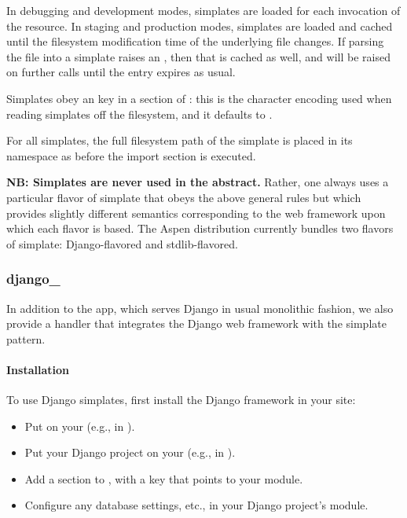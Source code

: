 In debugging and development modes, simplates are loaded for each invocation of
the resource. In staging and production modes, simplates are loaded and cached
until the filesystem modification time of the underlying file changes. If
parsing the file into a simplate raises an , then that is
cached as well, and will be raised on further calls until the entry expires as
usual.

Simplates obey an  key in a \code{[simplates]} section of
: this is the character encoding used when reading simplates
off the filesystem, and it defaults to .

For all simplates, the full filesystem path of the simplate is placed in its
namespace as  before the import section is executed.

\textbf{NB: Simplates are never used in the abstract.} Rather, one always uses a
particular flavor of simplate that obeys the above general rules but which
provides slightly different semantics corresponding to the web framework upon
which each flavor is based. The Aspen distribution currently bundles two flavors
of simplate: Django-flavored and stdlib-flavored.

\subsubsection{django_}
\label{api-handlers-simplates-django}


In addition to the  app, which serves Django in usual
monolithic fashion, we also provide a handler that integrates the Django web
framework with the simplate pattern.


\paragraph{Installation}

To use Django simplates, first install the Django framework in your site:

\begin{itemize}
\item{Put  on your  (e.g., in ).}
\item{Put your Django project on your  (e.g., in ).}
\item{Add a \code{[django]} section to , with a  key that points to your  module.}
\item{Configure any database settings, etc., in your Django project's  module.}
\end{itemize}

